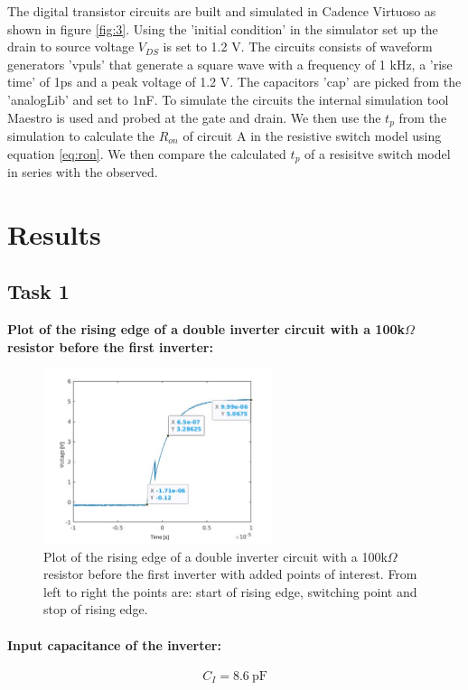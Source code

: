 \documentclass[onecolumn]{article}
\begin{document}
The digital transistor circuits are built and simulated in Cadence Virtuoso as shown in figure \ref*{fig:3}. Using the 'initial condition' in the simulator set up the drain to source voltage $V_{DS}$ is set to 1.2 V. The circuits consists of waveform generators 'vpuls' that generate a square wave with a frequency of 1 kHz, a 'rise time' of 1ps and a peak voltage of 1.2 V. The capacitors 'cap' are picked from the 'analogLib' and set to 1nF. To simulate the circuits the internal simulation tool Maestro is used and probed at the gate and drain. We then use the $t_p$ from the simulation to calculate the $R_{on}$ of circuit A in the resistive switch model using equation \ref{eq:ron}. We then compare the calculated $t_p$ of a resisitve switch model in series with the observed.

\clearpage

\section{Results}
\subsection{Task 1}
\textbf{Plot of the rising edge of a double inverter circuit with a 100k$\Omega$ resistor before the first inverter:}
\begin{figure}[h!]
  \centering
  \includegraphics[width=0.6\textwidth]{plot1.png}
  \caption{Plot of the rising edge of a double inverter circuit with a 100k$\Omega$ resistor before the first inverter with added points of interest. From left to right the points are: start of rising edge, switching point and stop of rising edge.}
  \label{fig:plot}
\end{figure}


\paragraph{Input capacitance of the inverter:}
\begin{equation}
    C_{I} = 8.6 \ \text{pF} \label{eq:1}
\end{equation}
\end{document}
